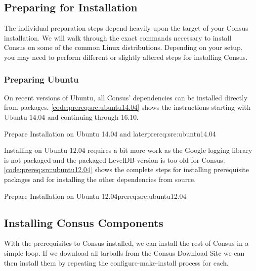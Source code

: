 \subsection{Preparing for Installation}

The individual preparation steps depend heavily upon the target of your Consus
installation.  We will walk through the exact commands necessary to install
Consus on some of the common Linux distributions.  Depending on your setup, you
may need to perform different or slightly altered steps for installing Consus.


\subsubsection*{Preparing Ubuntu}

On recent versions of Ubuntu, all Consus' dependencies can be installed directly
from packages.  \cref{code:prereq:src:ubuntu14.04} shows the instructions
starting with Ubuntu 14.04 and continuing through 16.10.

%
{Prepare Installation on Ubuntu 14.04 and later}{prereq:src:ubuntu14.04}

Installing on Ubuntu 12.04 requires a bit more work as the Google logging
library is not packaged and the packaged LevelDB version is too old for Consus.
\cref{code:prereq:src:ubuntu12.04} shows the complete steps for installing
prerequisite packages and for installing the other dependencies from source.

%
{Prepare Installation on Ubuntu 12.04}{prereq:src:ubuntu12.04}

\subsection{Installing Consus Components}

With the prerequisites to Consus installed, we can install the rest of Consus in
a simple loop.  If we download all tarballs from the Consus Download Site %
we can then install them by repeating the configure-make-install process for
each.

